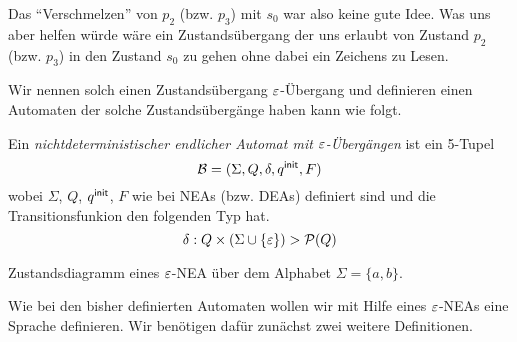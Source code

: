 Das "`Verschmelzen"' von $p_2$ (bzw. $p_3$) mit $s_0$ war also keine gute Idee.
Was uns aber helfen würde wäre ein Zustandsübergang der uns erlaubt von Zustand $p_2$ (bzw. $p_3$) in den Zustand $s_0$ zu gehen ohne dabei ein Zeichens zu Lesen.

Wir nennen solch einen Zustandsübergang $\varepsilon$-Übergang und definieren einen Automaten der solche Zustandsübergänge haben kann wie folgt.

\begin{Def}\label{def2.EpsNea}
        Ein \emph{nichtdeterministischer endlicher Automat mit $\varepsilon$-Übergängen} ist ein 5-Tupel
        \[ \mathcal{B}= (\Sigma, Q,\delta,{q^\mathsf{init}},F) \]
wobei $\Sigma$, $Q$, ${q^\mathsf{init}}$, $F$ wie bei NEAs (bzw. DEAs) definiert sind und die Transitionsfunkion den folgenden Typ hat.
$$ \delta:Q\times(\Sigma\cup\{\varepsilon\})\->\mathcal{P}(Q)$$
\end{Def}

\begin{Bsp}\label{bsp2.EpsNeaEx} Zustandsdiagramm eines $\varepsilon$-NEA über dem Alphabet $\Sigma=\{a,b\}$.
   \begin{center}
   \end{center}
\end{Bsp}

Wie bei den bisher definierten Automaten wollen wir mit Hilfe eines $\varepsilon$-NEAs eine Sprache definieren.
Wir benötigen dafür zunächst zwei weitere Definitionen.

